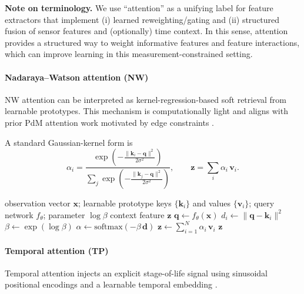\documentclass[sn-basic]{sn-jnl} %
\begin{document}
\textbf{Note on terminology.}
We use ``attention'' as a unifying label for feature extractors that implement (i) learned reweighting/gating and (ii) structured fusion of sensor features and (optionally) time context. In this sense, attention provides a structured way to weight informative features and feature interactions, which can improve learning in this measurement-constrained setting.

\paragraph{Nadaraya--Watson attention (NW)}
NW attention can be interpreted as kernel-regression-based soft retrieval from learnable prototypes. This mechanism is computationally light and aligns with prior PdM attention work motivated by edge constraints \cite{Siraskar2024}.

A standard Gaussian-kernel form is
\begin{equation}
\alpha_i = \frac{\exp\left(-\tfrac{\lVert \mathbf{k}_i-\mathbf{q}\rVert^2}{2\sigma^2}\right)}{\sum_j \exp\left(-\tfrac{\lVert \mathbf{k}_j-\mathbf{q}\rVert^2}{2\sigma^2}\right)},
\qquad \mathbf{z}=\sum_i\alpha_i\,\mathbf{v}_i.
\end{equation}

\begin{algorithm}[t]
\caption{NW attention feature extractor (forward pass)}
\label{alg:nw_forward}
\begin{algorithmic}[1]
\Require observation vector $\mathbf{x}$; learnable prototype keys $\{\mathbf{k}_i\}$ and values $\{\mathbf{v}_i\}$; query network $f_\theta$; parameter $\log\beta$
\Ensure context feature $\mathbf{z}$
\State $\mathbf{q} \gets f_\theta(\mathbf{x})$ 
		\State $d_i \gets \lVert \mathbf{q}-\mathbf{k}_i\rVert^2$
\EndFor
\State $\beta \gets \exp(\log\beta)$ 
\State $\alpha \gets \mathrm{softmax}(-\beta\,\mathbf{d})$ 
\State $\mathbf{z} \gets \sum_{i=1}^{N} \alpha_i\,\mathbf{v}_i$
\State \Return $\mathbf{z}$
\end{algorithmic}
\end{algorithm}

\paragraph{Temporal attention (TP)}
Temporal attention injects an explicit stage-of-life signal using sinusoidal positional encodings and a learnable temporal embedding \cite{Vaswani2017}.
\end{document}
